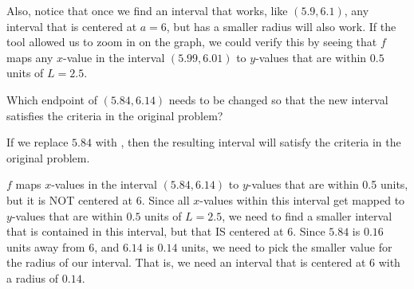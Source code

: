 \documentclass{ximera}
\begin{document}
\begin{exercise}
\begin{question}
\begin{feedback}
 			Also, notice that once we find an interval that works, like $ (5.9, 6.1)$, any interval that is centered at $a=6$, but has a smaller radius will also work.  If the tool allowed us to zoom in on the graph, we could verify this by seeing that $f$ maps any $x$-value in the interval $ (5.99, 6.01) $ to $y$-values that are within $0.5$ units of $L=2.5$.
 		\end{feedback}
 		\begin{question}
 			Which endpoint of $ (5.84, 6.14) $ needs to be changed so that the new interval satisfies the criteria in the original problem?  
 			\begin{question}
 				If we replace $5.84$ with , then the resulting interval will satisfy the criteria in the original problem. 
				\begin{feedback}
					$f$ maps $x$-values in the interval $ (5.84, 6.14) $ to $y$-values that are within 0.5 units, but it is NOT centered at $6$.  Since all $x$-values within this interval get mapped to $y$-values that are within $0.5$ units of $L=2.5$, we need to find a smaller interval that is contained in this interval, but that IS centered at $6$.  Since $5.84$ is $0.16$ units away from $6$, and $6.14$ is $0.14$ units, we need to pick the smaller value for the radius of our interval.  That is, we need an interval that is centered at $6$ with a radius of $0.14$.  
				\end{feedback}
			\end{question}
 		\end{question}
 	\end{question}
    \end{exercise}
\end{document}
